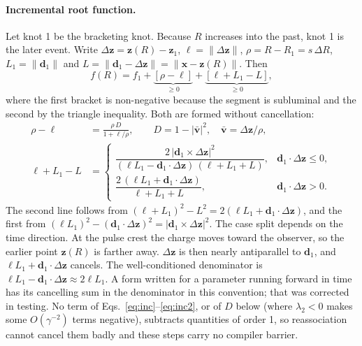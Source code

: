 \documentclass[11pt, a4paper]{article}
\begin{document}
\paragraph{Incremental root function.} Let knot 1 be the bracketing knot. Because $R$ increases into the past, knot 1 is the later event. Write $\Delta\mathbf{z} = \mathbf{z}(R) - \mathbf{z}_1$, $\ell = \|\Delta\mathbf{z}\|$, $\rho = R - R_1 = s\,\Delta R$, $L_1 = \|\mathbf{d}_1\|$ and $L = \|\mathbf{d}_1 - \Delta\mathbf{z}\| = \|\mathbf{x} - \mathbf{z}(R)\|$. Then
\begin{equation}
f(R) = f_1 + \underbrace{\left[\rho - \ell\right]}_{\ge 0} + \underbrace{\left[\ell + L_1 - L\right]}_{\ge 0},
\label{eq:inc}
\end{equation}
where the first bracket is non-negative because the segment is subluminal and the second by the triangle inequality. Both are formed without cancellation:
\begin{align}
\rho - \ell &= \frac{\rho\, D}{1 + \ell/\rho}, \qquad D = 1 - |\bar{\mathbf{v}}|^2, \quad \bar{\mathbf{v}} = \Delta\mathbf{z}/\rho, \label{eq:inc1}\\
\ell + L_1 - L &= \begin{cases}
\dfrac{2\,|\mathbf{d}_1 \times \Delta\mathbf{z}|^2}{(\ell L_1 - \mathbf{d}_1\!\cdot\!\Delta\mathbf{z})\,(\ell + L_1 + L)}, & \mathbf{d}_1\!\cdot\!\Delta\mathbf{z} \le 0,\\[2ex]
\dfrac{2\,(\ell L_1 + \mathbf{d}_1\!\cdot\!\Delta\mathbf{z})}{\ell + L_1 + L}, & \mathbf{d}_1\!\cdot\!\Delta\mathbf{z} > 0.
\end{cases} \label{eq:inc2}
\end{align}
The second line follows from $(\ell + L_1)^2 - L^2 = 2(\ell L_1 + \mathbf{d}_1\cdot\Delta\mathbf{z})$, and the first from $(\ell L_1)^2 - (\mathbf{d}_1\cdot\Delta\mathbf{z})^2 = |\mathbf{d}_1 \times \Delta\mathbf{z}|^2$. The case split depends on the time direction. At the pulse crest the charge moves toward the observer, so the earlier point $\mathbf{z}(R)$ is farther away. $\Delta\mathbf{z}$ is then nearly antiparallel to $\mathbf{d}_1$, and $\ell L_1 + \mathbf{d}_1\cdot\Delta\mathbf{z}$ cancels. The well-conditioned denominator is $\ell L_1 - \mathbf{d}_1\cdot\Delta\mathbf{z} \approx 2\ell L_1$. A form written for a parameter running forward in time has its cancelling sum in the denominator in this convention; that was corrected in testing. No term of Eqs.~\eqref{eq:inc}--\eqref{eq:inc2}, or of $D$ below (where $\lambda_2 < 0$ makes some $O(\gamma^{-2})$ terms negative), subtracts quantities of order 1, so reassociation cannot cancel them badly and these steps carry no compiler barrier.
\end{document}
